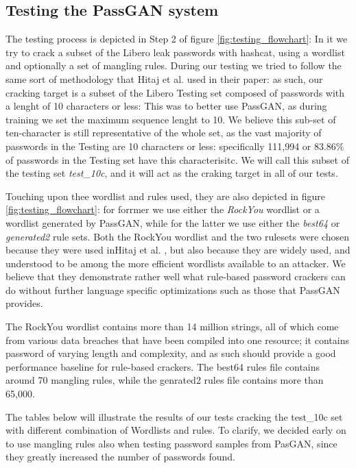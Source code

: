 \subsection{Testing the PassGAN system}
The testing process is depicted in Step 2 of figure \ref{fig:testing_flowchart}: In it we try to crack a subset of the Libero leak passwords with hashcat, using a wordlist and optionally a set of mangling rules.
During our testing we tried to follow the same sort of methodology that Hitaj et al.\cite{PassGAN} used in their paper: as such, our cracking target is a subset of the Libero Testing set composed of passwords with a lenght of 10 characters or less: This was to better use PassGAN, as during training we set the maximum sequence lenght to 10.
We believe this sub-set of ten-character is still representative of the whole set, as the vast majority of passwords in the Testing are 10 characters or less: specifically 111,994 or 83.86\% of passwords in the Testing set have this characterisitc. We will call this subset of the testing set \emph{test\_10c}, and it will act as the craking target in all of our tests. 

Touching upon thee wordlist and rules used, they are also depicted in figure \ref{fig:testing_flowchart}: for forrmer we use either the \emph{RockYou} wordlist or a wordlist generated by PassGAN, while for the latter we use either the \emph{best64} or \emph{generated2} rule sets. Both the RockYou wordlist and the two rulesets were chosen because they were used inHitaj et al. \cite{PassGAN}, but also because they are widely used, and understood to be among the more efficient wordlists available to an attacker. We believe that they demonstrate rather well what rule-based password crackers can do without further language specific optimizations such as those that PassGAN provides.

The RockYou wordlist contains more than 14 million strings, all of which come from various data breaches that have been compiled into one resource; it contains password of varying length and complexity, and as such should provide a good performance baseline for rule-based crackers. The best64 rules file contains around 70 mangling rules, while the genrated2 rules file contains more than 65,000. 

The tables below will illustrate the results of our tests cracking the test\_10c set with different combination of Wordlists and rules. To clarify, we decided early on to use mangling rules also when testing password samples from PasGAN, since they greatly increased the number of passwords found. %

